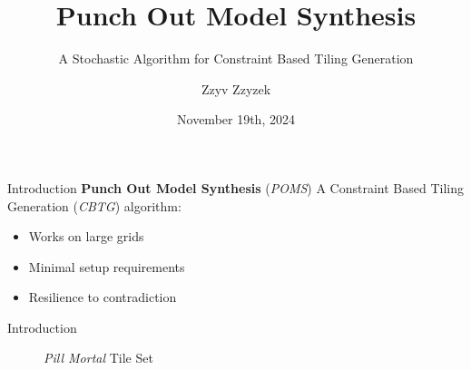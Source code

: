 \documentclass{beamer}
\title{Punch Out Model Synthesis}
\subtitle{A Stochastic Algorithm for Constraint Based Tiling Generation}
\date{November 19th, 2024}
\author{Zzyv Zzyzek}
\begin{document}
\newcommand{\specialcell}[2][c]{\begin{tabular}[#1]{@{}l@{}}#2\end{tabular}}
\newcommand{\specialcellCenter}[2][c]{\begin{tabular}[#1]{@{}c@{}}#2\end{tabular}}

  \maketitle



  \begin{frame}[fragile]{Introduction}
    \textbf{Punch Out Model Synthesis} (\textit{POMS})
    A Constraint Based Tiling Generation (\textit{CBTG}) algorithm:
    \begin{itemize}
      \item Works on large grids
      \item Minimal setup requirements
      \item Resilience to contradiction
    \end{itemize}

  \end{frame}

  \begin{frame}[fragile]{Introduction}
    \begin{figure}
      \textit{Pill Mortal} Tile Set

    \end{figure}
  \end{frame}

\end{document}
